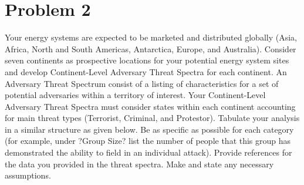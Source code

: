 \documentclass[a4paper]{article}
\begin{document}
\newpage
\section*{Problem 2}
Your energy systems are expected to be marketed and distributed globally (Asia, Africa, North and South Americas, Antarctica, Europe, and Australia). Consider seven continents as prospective locations for your potential energy system sites and develop Continent-Level Adversary Threat Spectra for each continent. An Adversary Threat Spectrum consist of a listing of characteristics for a set of potential adversaries within a territory of interest. Your Continent-Level Adversary Threat Spectra must consider states within each continent accounting for main threat types (Terrorist, Criminal, and Protestor). Tabulate your analysis in a similar structure as given below. Be as specific as possible for each category (for example, under ?Group Size? list the number of people that this group has demonstrated the ability to field in an individual attack). Provide references for the data you provided in the threat spectra. Make and state any necessary assumptions.
\end{document}

